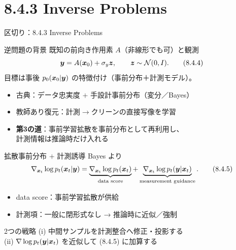 \section{8.4.3 Inverse Problems}
\asmain
\begin{frame}{区切り：8.4.3 Inverse Problems}
    \tableofcontents[currentsection]
\end{frame}
\asmain
\begin{frame}{逆問題の背景}
    既知の前向き作用素 $A$（非線形でも可）と観測
    \[
        \bm{y}=A(\bm{x}_0)+\sigma_y\bm{z},
        \qquad \bm{z}\sim\mathcal{N}(0,I).
        \tag{8.4.4}
    \]
    目標は事後 $p_0(\bm{x}_0|\bm{y})$ の特徴付け（事前分布＋計測モデル）。
    \begin{itemize}
        \item 古典：データ忠実度 $+$ 手設計事前分布（変分／Bayes）
        \item 教師あり復元：計測$\to$クリーンの直接写像を学習
        \item \textbf{第3の道}：事前学習拡散を事前分布として再利用し、\\
        計測情報は推論時だけ入れる
    \end{itemize}
\end{frame}
\asmain
\begin{frame}{拡散事前分布 $+$ 計測誘導}
    Bayes より
    \[
        \nabla_{\bm{x}_t}\log p_t(\bm{x}_t|\bm{y})
        =
        \underbrace{\nabla_{\bm{x}_t}\log p_t(\bm{x}_t)}_{\text{data score}}
        +
        \underbrace{\nabla_{\bm{x}_t}\log p_t(\bm{y}|\bm{x}_t)}_{\text{measurement guidance}}.
        \tag{8.4.5}
    \]
    \begin{itemize}
        \item data score：事前学習拡散が供給
        \item 計測項：一般に閉形式なし → 推論時に近似／強制
    \end{itemize}
    \begin{block}{2つの戦略}
        (i) 中間サンプルを計測整合へ修正・投影する\\
        (ii) $\nabla\log p_t(\bm{y}|\bm{x}_t)$ を近似して (8.4.5) に加算する
    \end{block}
\end{frame}
\asmain
